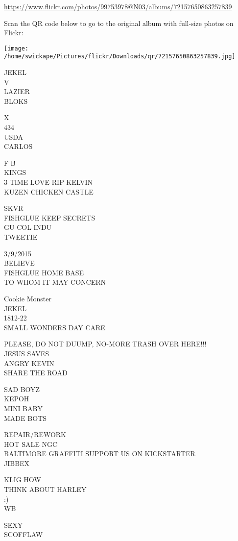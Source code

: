 \documentclass[10pt,letterpaper]{article}
\begin{document}
\url{https://www.flickr.com/photos/99753978@N03/albums/72157650863257839}

Scan the QR code below to go to the original album with full-size photos on Flickr:

\texttt{[image: /home/swickape/Pictures/flickr/Downloads/qr/72157650863257839.jpg]}


JEKEL\\
V\\
LAZIER\\
BLOKS

X\\
434\\
USDA\\
CARLOS

F B\\
KINGS\\
3 TIME LOVE RIP KELVIN\\
KUZEN CHICKEN CASTLE

SKVR\\
FISHGLUE KEEP SECRETS\\
GU COL INDU\\
TWEETIE

3/9/2015\\
BELIEVE\\
FISHGLUE HOME BASE\\
TO WHOM IT MAY CONCERN

Cookie Monster\\
JEKEL\\
1812{-}22\\
SMALL WONDERS DAY CARE

PLEASE, DO NOT DUUMP, NO{-}MORE TRASH OVER HERE!!!\\
JESUS SAVES\\
ANGRY KEVIN\\
SHARE THE ROAD

SAD BOYZ\\
KEPOH\\
MINI BABY\\
MADE BOTS

REPAIR/REWORK\\
HOT SALE NGC\\
BALTIMORE GRAFFITI SUPPORT US ON KICKSTARTER\\
JIBBEX

KLIG HOW\\
THINK ABOUT HARLEY\\
:)\\
WB

SEXY\\
SCOFFLAW
\end{document}
